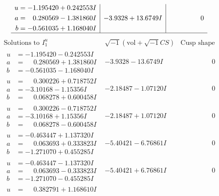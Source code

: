 \documentclass[1p]{elsarticle_modified}
\theoremstyle{definition}
\newcommand{\I}{\sqrt{-1}}
\begin{document}
$$\begin{array}{c|c|c}
\begin{aligned}
u &= -1.195420 + 0.242553 I \\
a &= \phantom{-}0.280569 - 1.381860 I \\
b &= -0.561035 + 1.168040 I\end{aligned}
 & -3.9328 + 13.6749 I & \phantom{-0.000000 } 0\\
 \hline 
 \end{array}$$\newpage$$\begin{array}{c|c|c}  
\text{Solutions to }I^u_{1}& \I (\text{vol} + \sqrt{-1}CS) & \text{Cusp shape}\\
 \hline 
\begin{aligned}
u &= -1.195420 - 0.242553 I \\
a &= \phantom{-}0.280569 + 1.381860 I \\
b &= -0.561035 - 1.168040 I\end{aligned}
 & -3.9328 - 13.6749 I & \phantom{-0.000000 } 0 \\ \hline\begin{aligned}
u &= \phantom{-}0.300226 + 0.718752 I \\
a &= -3.10168 - 1.15356 I \\
b &= \phantom{-}0.068278 + 0.600458 I\end{aligned}
 & -2.18487 - 1.07120 I & \phantom{-0.000000 } 0 \\ \hline\begin{aligned}
u &= \phantom{-}0.300226 - 0.718752 I \\
a &= -3.10168 + 1.15356 I \\
b &= \phantom{-}0.068278 - 0.600458 I\end{aligned}
 & -2.18487 + 1.07120 I & \phantom{-0.000000 } 0 \\ \hline\begin{aligned}
u &= -0.463447 + 1.137320 I \\
a &= \phantom{-}0.063693 + 0.333823 I \\
b &= -1.271070 + 0.455285 I\end{aligned}
 & -5.40421 - 6.76861 I & \phantom{-0.000000 } 0 \\ \hline\begin{aligned}
u &= -0.463447 - 1.137320 I \\
a &= \phantom{-}0.063693 - 0.333823 I \\
b &= -1.271070 - 0.455285 I\end{aligned}
 & -5.40421 + 6.76861 I & \phantom{-0.000000 } 0 \\ \hline\begin{aligned}
u &= \phantom{-}0.382791 + 1.168610 I \\

\end{aligned}
\end{array}$$
\end{document}
